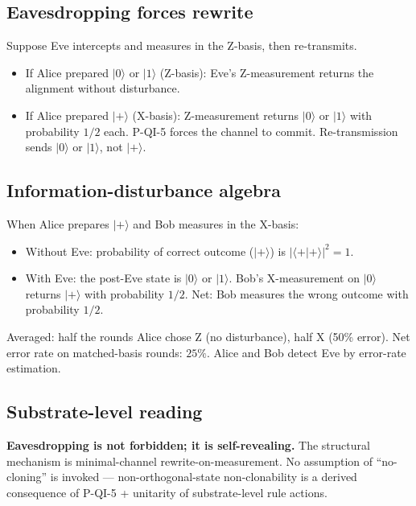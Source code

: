 \documentclass[11pt,a4paper]{article}
\begin{document}
\subsection{Eavesdropping forces rewrite}

Suppose Eve intercepts and measures in the Z-basis, then re-transmits.

\begin{itemize}[noitemsep]
  \item If Alice prepared $|0\rangle$ or $|1\rangle$ (Z-basis): Eve's Z-measurement returns the alignment without disturbance.
  \item If Alice prepared $|+\rangle$ (X-basis): Z-measurement returns $|0\rangle$ or $|1\rangle$ with probability $1/2$ each. P-QI-5 forces the channel to commit. Re-transmission sends $|0\rangle$ or $|1\rangle$, not $|+\rangle$.
\end{itemize}

\subsection{Information-disturbance algebra}

When Alice prepares $|+\rangle$ and Bob measures in the X-basis:

\begin{itemize}[noitemsep]
  \item Without Eve: probability of correct outcome ($|+\rangle$) is $|\langle +|+\rangle|^2 = 1$.
  \item With Eve: the post-Eve state is $|0\rangle$ or $|1\rangle$. Bob's X-measurement on $|0\rangle$ returns $|+\rangle$ with probability $1/2$. Net: Bob measures the wrong outcome with probability $1/2$.
\end{itemize}

Averaged: half the rounds Alice chose Z (no disturbance), half X (50\% error). Net error rate on matched-basis rounds: $25\%$. Alice and Bob detect Eve by error-rate estimation.

\subsection{Substrate-level reading}

\textbf{Eavesdropping is not forbidden; it is self-revealing.} The structural mechanism is minimal-channel rewrite-on-measurement. No assumption of ``no-cloning'' is invoked --- non-orthogonal-state non-clonability is a derived consequence of P-QI-5 + unitarity of substrate-level rule actions.
\end{document}

